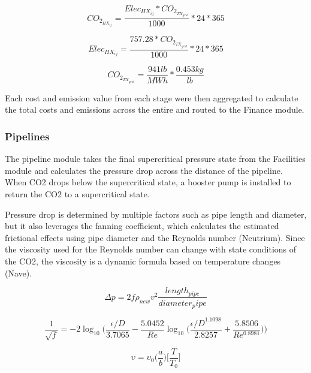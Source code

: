 \documentclass[balance,upint,subscriptcorrection,varvw,mathalfa=cal=boondoxo,spanish,french,vietnamese,russian,greek,pdf-a,colorlinks]{asmeconf}
\begin{document}
\begin{equation}
    CO_{2_{HX_{ij}}} = \frac{Elec_{HX_{ij}}*CO_{2_{TX_{grid}}}}{1000}*24*365
\end{equation}

\begin{equation}
    Elec_{HX_{ij}} = \frac{757.28*CO_{2_{TX_{grid}}}}{1000}*24*365
\end{equation}

\begin{equation}
    CO_{2_{TX_{grid}}} = \frac{941 lb}{MWh}*\frac{0.453 kg}{lb}
\end{equation}

Each cost and emission value from each stage were then aggregated to calculate the total costs and emissions across the entire and routed to the Finance module.

\subsubsection{Pipelines}

The pipeline module takes the final supercritical pressure state from the Facilities module and calculates the pressure drop across the distance of the pipeline. When CO2 drops below the supercritical state, a booster pump is installed to return the CO2 to a supercritical state. 

Pressure drop is determined by multiple factors such as pipe length and diameter, but it also leverages the fanning coefficient, which calculates the estimated frictional effects using pipe diameter and the Reynolds number (Neutrium).  Since the viscosity used for the Reynolds number can change with state conditions of the CO2, the viscosity is a dynamic formula based on temperature changes (Nave).

\begin{equation}
    \Delta p = 2f\rho_{new}v^2\frac{length_{pipe}}{diameter_pipe}
\end{equation}

\begin{equation}
    \frac{1}{\sqrt{f}} = -2\log_{10}\Bigg(\frac{\epsilon/D}{3.7065}-\frac{5.0452}{Re}\log_{10}\bigg(\frac{{\epsilon/D}^{1.1098}}{2.8257}+\frac{5.8506}{Re^{0.8981}}\bigg)\Bigg)
\end{equation}

\begin{equation}
    \upsilon = \upsilon_0\bigg(\frac{a}{b}\bigg)\bigg[\frac{T}{T_0}\bigg]
\end{equation}
\end{document}
